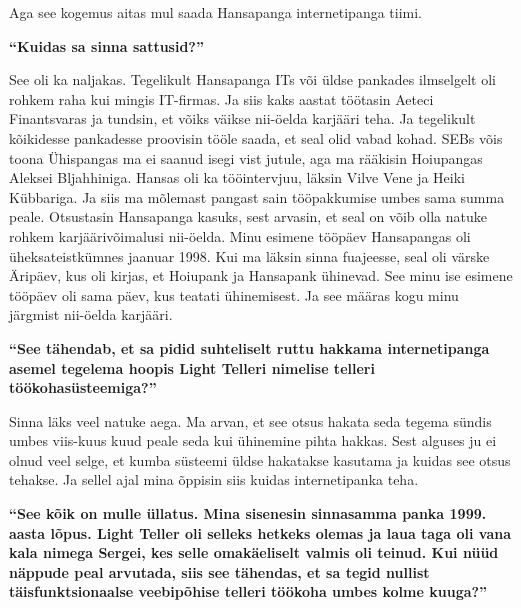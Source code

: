 Aga see kogemus aitas mul saada Hansapanga internetipanga 
tiimi.

\textbf{\enquote{Kuidas sa sinna sattusid?}}

See oli ka naljakas. Tegelikult Hansapanga ITs või üldse pankades ilmselgelt 
oli rohkem raha kui mingis IT-firmas. Ja siis kaks aastat töötasin Aeteci
Finantsvaras ja tundsin, et võiks väikse nii-öelda karjääri teha. Ja tegelikult 
kõikidesse pankadesse proovisin tööle saada, et seal olid vabad kohad. 
SEBs võis toona Ühispangas ma ei 
saanud isegi vist jutule, aga ma rääkisin Hoiupangas Aleksei 
Bljahhiniga. Hansas oli ka tööintervjuu, läksin 
Vilve Vene ja Heiki Kübbariga. Ja siis ma mõlemast pangast sain tööpakkumise umbes sama summa peale. 
Otsustasin Hansapanga kasuks, sest arvasin, et seal on võib olla natuke rohkem 
karjäärivõimalusi nii-öelda. Minu esimene tööpäev Hansapangas oli 
üheksateistkümnes jaanuar 1998. Kui ma läksin sinna fuajeesse, seal oli värske 
Äripäev, kus oli kirjas, et Hoiupank ja Hansapank ühinevad. See minu ise 
esimene tööpäev oli sama päev, kus teatati ühinemisest. Ja see määras kogu minu 
järgmist nii-öelda karjääri.


\textbf{\enquote{See tähendab, et sa pidid suhteliselt ruttu hakkama 
internetipanga asemel tegelema hoopis Light Telleri nimelise telleri 
töökohasüsteemiga?}}

Sinna läks veel natuke aega. Ma arvan, et see otsus hakata seda tegema sündis 
umbes viis-kuus kuud peale seda kui ühinemine pihta hakkas. Sest alguses ju  
ei olnud veel selge, et kumba süsteemi üldse hakatakse kasutama ja kuidas see 
otsus tehakse. Ja sellel ajal mina õppisin siis kuidas internetipanka teha.

\textbf{\enquote{See kõik on mulle üllatus. Mina sisenesin sinnasamma panka 
1999. aasta lõpus. Light Teller oli selleks hetkeks olemas ja laua taga oli 
vana kala nimega Sergei, kes selle omakäeliselt valmis oli teinud. Kui nüüd 
näppude peal arvutada, siis see tähendas, et sa tegid nullist 
täisfunktsionaalse veebipõhise telleri töökoha umbes kolme kuuga?}}

